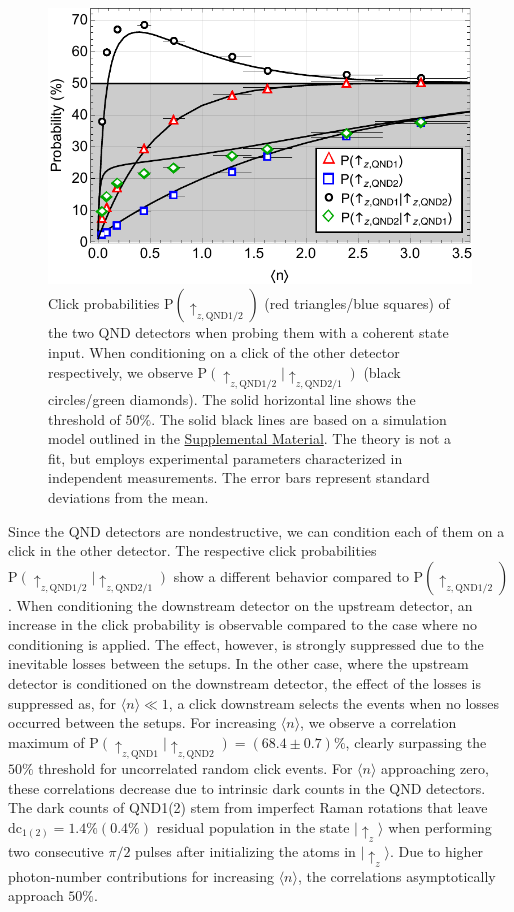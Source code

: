 \documentclass[prl,twocolumn,amsmath,amssymb,bibnotes,aps,longbibliography]{revtex4-1}
\newcommand{\ket}[1]{|{#1}\rangle}
\newcommand{\braket}[1]{\langle{#1}\rangle}
\begin{document}
\begin{figure}[t]
\centering
\includegraphics[width=\columnwidth]{Fig2.pdf}
\caption{\label{fig:correlations} Click probabilities $\text{P}(\uparrow_{z,\text{QND1/2}})$ (red triangles/blue squares) of the two QND detectors when probing them with a coherent state input. When conditioning on a click of the other detector respectively, we observe $\text{P}(\uparrow_{z,\text{QND1/2}}\vert\uparrow_{z,\text{QND2/1}})$ (black circles/green diamonds). The solid horizontal line shows the threshold of $50\%$. The solid black lines are based on a simulation model outlined in the \hyperref[supplement]{Supplemental Material}. The theory is not a fit, but employs experimental parameters characterized in independent measurements. The error bars represent standard deviations from the mean. }
\end{figure}
Since the QND detectors are nondestructive, we can condition each of them on a click in the other detector. The respective click probabilities $\text{P}(\uparrow_{z,\text{QND1/2}}\vert\uparrow_{z,\text{QND2/1}})$ show a different behavior compared to $\text{P}(\uparrow_{z,\text{QND1/2}})$. When conditioning the downstream detector on the upstream detector, an increase in the click probability is observable compared to the case where no conditioning is applied. The effect, however, is strongly suppressed due to the inevitable losses between the setups. In the other case, where the upstream detector is conditioned on the downstream detector, the effect of the losses is suppressed as, for $\braket{n} \ll 1$, a click downstream selects the events when no losses occurred between the setups. For increasing $\braket{n}$, we observe a correlation maximum of $\text{P}(\uparrow_{z, \text{QND1}}\vert \uparrow_{z, \text{QND2}})=(68.4\pm0.7)\%$, clearly surpassing the $50\%$ threshold for uncorrelated random click events. For $\braket{n}$ approaching zero, these correlations decrease due to intrinsic dark counts in the QND detectors. The dark counts of QND1(2) stem from imperfect Raman rotations that leave $\text{dc}_{1(2)}=1.4\%(0.4\%)$ residual population in the state $\ket{\uparrow_z}$ when performing two consecutive $\pi/2$ pulses after initializing the atoms in $\ket{\uparrow_z}$. Due to higher photon-number contributions for increasing $\braket{n}$, the correlations asymptotically approach $50\%$.
\end{document}
